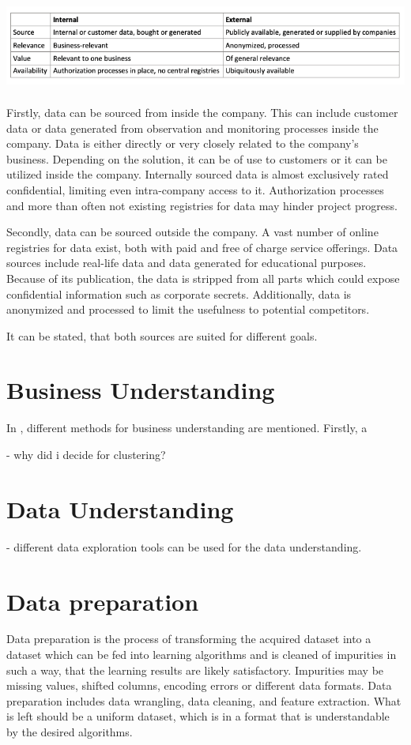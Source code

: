 	\includegraphics[height=3cm]{Bilder/internal_external.png}
	
	Firstly, data can be sourced from inside the company. This can include customer data or data generated from observation and monitoring processes inside the company. Data is either directly or very closely related to the company's business. Depending on the solution, it can be of use to customers or it can be utilized inside the company. Internally sourced data is almost exclusively rated confidential, limiting even intra-company access to it. Authorization processes and more than often not existing registries for data may hinder project progress.
	
	Secondly, data can be sourced outside the company. A vast number of online registries for data exist, both with paid and free of charge service offerings. Data sources include real-life data and data generated for educational purposes. Because of its publication, the data is stripped from all parts which could expose confidential information such as corporate secrets. Additionally, data is anonymized and processed to limit the usefulness to potential competitors.
	
	It can be stated, that both sources are suited for different goals. 

\section{Business Understanding}
	In \cite{CRISPDM2000}, different methods for business understanding are mentioned. Firstly, a 

	- why did i decide for clustering?

\section{Data Understanding}
	- different data exploration tools can be used for the data understanding.

\section{Data preparation}

Data preparation is the process of transforming the acquired dataset into a dataset which can be fed into learning algorithms and is cleaned of impurities in such a way, that the learning results are likely satisfactory. Impurities may be missing values, shifted columns, encoding errors or different data formats. 
Data preparation includes data wrangling, data cleaning, and feature extraction. What is left should be a uniform dataset, which is in a format that is understandable by the desired algorithms.

